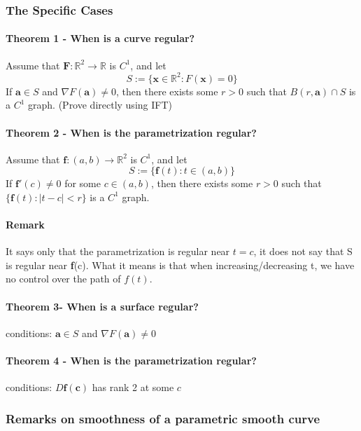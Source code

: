 \documentclass[11pt]{article}
\newcommand{\tb}[1]{\textbf{#1}}
\newcommand{\real}[0]{\mathbb{R}}
\newcommand{\func}[3]{\tb{#1}: {#2} \rightarrow {#3} }
\begin{document}
\subsubsection{The Specific Cases}
\paragraph{Theorem 1 - When is a curve regular?}
Assume that $\func{F}{\real^2}{\real}$ is $C^1$, and let
$$S:=\{\tb{x} \in \real^2: F(\tb{x}) = 0 \}$$
If $\tb{a} \in S$ and $\nabla F(\tb{a}) \neq 0$, then there exists some $r>0$ such that $B(r, \tb{a}) \cap S$ is a $C^1$ graph. \newline
(Prove directly using IFT)
\paragraph{Theorem 2 - When is the parametrization regular?} 
Assume that $\func{f}{(a, b)}{\real ^2}$ is $C^1$, and let
$$S:=\{ \tb{f}(t): t \in (a, b)\}$$
If $\tb{f}'(c) \neq 0$ for some $c \in (a, b)$, then there exists some $r>0$ such that $\{ \tb{f} (t): |t-c| < r\}$ is a $C^1$ graph. \newline
\paragraph{Remark}
It says only that the parametrization is regular near $t = c$, it does not say that S is regular near \tb{f}(c). What it means is that when increasing/decreasing t, we have no control over the path of $f(t)$.
\paragraph{Theorem 3- When is a surface regular?}
conditions: $\tb{a} \in S$ and $\nabla F(\tb{a}) \neq 0$
\paragraph{Theorem 4 - When is the parametrization regular?}
conditions: $D\tb{f}(\tb{c})$ has rank 2 at some $c$

\subsubsection{Remarks on smoothness of a parametric smooth curve} 
\end{document}
